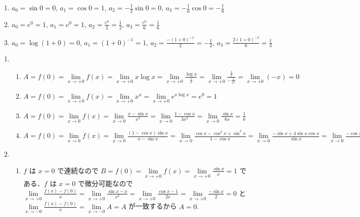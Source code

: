 \documentclass[11pt, uplatex, dvipdfmx, twoside]{jsarticle}
\renewcommand{\dlim}{\lim\limits} %
\begin{document}
\begin{enumerate}[label=\ref{sec:derivative}.\arabic*]
\begin{enumerate}[label=(\arabic*)]
  \item
    $a_0 = \sin 0 =0, \, a_1 = \cos 0 = 1, \, a_2 = -\frac{1}{2}\sin 0 =0, \, a_3 =
    -\frac{1}{6}\cos 0 = -\frac{1}{6}$

  \item
    $a_0 = e^0=1, \, a_1=e^0=1, \, a_2= \frac{e^0}{2}=\frac{1}{2}, \,
    a_3=\frac{e^0}{6}=\frac{1}{6}$

  \item
    $a_0=\log (1+0) =0, \, a_1 = (1+0)^{-1} = 1, \, a_2 = \frac{-(1+0)^{-2}}{2}=
    -\frac{1}{2}, \, a_3 = \frac{2(1+0)^{-3}}{6} = \frac{1}{3}$
  \end{enumerate}

\end{enumerate}

\begin{enumerate}[label=\ref{sec:hospital}.\arabic*]
  \setlength{\itemsep}{1ex}
  
\item
  \begin{enumerate}[label=(\arabic*)]
    \setlength{\itemsep}{1ex}
    
  \item
    $A = f(0) = \dlim_{x \to +0} f(x) = \dlim_{x \to +0} x \log x =
    \dlim_{x \to +0} \frac{\log x}{\frac{1}{x}} = \dlim_{x \to +0}
    \frac{\frac{1}{x}}{-\frac{1}{x^2}} = \dlim_{x \to +0} (-x) =0$

  \item
    $A = f(0) = \dlim_{x \to +0} f(x) = \dlim_{x \to +0} x^x =
    \dlim_{x \to +0} e^{x \log x} = e^0 = 1$

  \item
    $A= f(0) = \dlim_{x \to 0}f(x) = \dlim_{x \to 0} \frac{x-\sin
      x}{x^3} = \dlim_{x \to 0}\frac{1-\cos x}{3x^2}=\dlim_{x \to 0}\frac{\sin x}{6x} =\frac{1}{6}$

  \item
    $A=f(0) = \dlim_{x \to 0} f(x) = \dlim_{x \to 0} \frac{(1-\cos
      x)\sin x}{x-\sin x}=\dlim_{x \to 0} \frac{\cos x - \cos^2 x +
      \sin^2x}{1-\cos x} = \dlim_{x \to 0} \frac{-\sin x + 4 \sin x
      \cos x}{\sin x} = \dlim_{x \to 0} \frac{-\cos x + 4\cos^2 x - 4\sin^2 x}{\cos x} = 3$
    
  \end{enumerate}

\item
  \begin{enumerate}[label=(\arabic*)]
    \setlength{\itemsep}{1ex}
    
  \item $f$ は $x=0$ で連続なので
    $B=f(0) = \dlim_{x \to +0} f(x) = \dlim_{x \to +0}\frac{\sin x}{x}
    = 1$ である．$f$ は $x=0$ で微分可能なので
    $\dlim_{x \to +0} \frac{f(x)-f(0)}{x} = \dlim_{x \to +0}
    \frac{\sin x - x}{x^2} = \dlim_{x \to +0} \frac{\cos x-1}{2x} =
    \dlim_{x \to +0} \frac{-\sin x}{2} = 0$ と $\dlim_{x \to -0}
    \frac{f(x)-f(0)}{x} = \dlim_{x \to -0} A = A$ が一致するから $A=0$.
    

\end{enumerate}
\end{enumerate}
\end{document}
